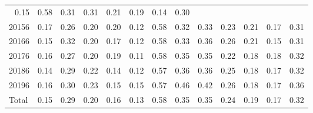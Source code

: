 \begin{table}[!h]
\begin{tabular}{lllllllllllll}
  \multicolumn{1}{r}{0.15} &
  \multicolumn{1}{r}{0.58} &
  \multicolumn{1}{r}{0.31} &
  \multicolumn{1}{r}{0.31} &
  \multicolumn{1}{r}{0.21} &
  \multicolumn{1}{r}{0.19} &
  \multicolumn{1}{r}{0.14} &
  \multicolumn{1}{r}{0.30} \\
\multicolumn{1}{l}{\hspace{1em}20156} &
  \multicolumn{1}{|r}{0.17} &
  \multicolumn{1}{r}{0.26} &
  \multicolumn{1}{r}{0.20} &
  \multicolumn{1}{r}{0.20} &
  \multicolumn{1}{r}{0.12} &
  \multicolumn{1}{r}{0.58} &
  \multicolumn{1}{r}{0.32} &
  \multicolumn{1}{r}{0.33} &
  \multicolumn{1}{r}{0.23} &
  \multicolumn{1}{r}{0.21} &
  \multicolumn{1}{r}{0.17} &
  \multicolumn{1}{r}{0.31} \\
\multicolumn{1}{l}{\hspace{1em}20166} &
  \multicolumn{1}{|r}{0.15} &
  \multicolumn{1}{r}{0.32} &
  \multicolumn{1}{r}{0.20} &
  \multicolumn{1}{r}{0.17} &
  \multicolumn{1}{r}{0.12} &
  \multicolumn{1}{r}{0.58} &
  \multicolumn{1}{r}{0.33} &
  \multicolumn{1}{r}{0.36} &
  \multicolumn{1}{r}{0.26} &
  \multicolumn{1}{r}{0.21} &
  \multicolumn{1}{r}{0.15} &
  \multicolumn{1}{r}{0.31} \\
\multicolumn{1}{l}{\hspace{1em}20176} &
  \multicolumn{1}{|r}{0.16} &
  \multicolumn{1}{r}{0.27} &
  \multicolumn{1}{r}{0.20} &
  \multicolumn{1}{r}{0.19} &
  \multicolumn{1}{r}{0.11} &
  \multicolumn{1}{r}{0.58} &
  \multicolumn{1}{r}{0.35} &
  \multicolumn{1}{r}{0.35} &
  \multicolumn{1}{r}{0.22} &
  \multicolumn{1}{r}{0.18} &
  \multicolumn{1}{r}{0.18} &
  \multicolumn{1}{r}{0.32} \\
\multicolumn{1}{l}{\hspace{1em}20186} &
  \multicolumn{1}{|r}{0.14} &
  \multicolumn{1}{r}{0.29} &
  \multicolumn{1}{r}{0.22} &
  \multicolumn{1}{r}{0.14} &
  \multicolumn{1}{r}{0.12} &
  \multicolumn{1}{r}{0.57} &
  \multicolumn{1}{r}{0.36} &
  \multicolumn{1}{r}{0.36} &
  \multicolumn{1}{r}{0.25} &
  \multicolumn{1}{r}{0.18} &
  \multicolumn{1}{r}{0.17} &
  \multicolumn{1}{r}{0.32} \\
\multicolumn{1}{l}{\hspace{1em}20196} &
  \multicolumn{1}{|r}{0.16} &
  \multicolumn{1}{r}{0.30} &
  \multicolumn{1}{r}{0.23} &
  \multicolumn{1}{r}{0.15} &
  \multicolumn{1}{r}{0.15} &
  \multicolumn{1}{r}{0.57} &
  \multicolumn{1}{r}{0.46} &
  \multicolumn{1}{r}{0.42} &
  \multicolumn{1}{r}{0.26} &
  \multicolumn{1}{r}{0.18} &
  \multicolumn{1}{r}{0.17} &
  \multicolumn{1}{r}{0.36} \\
\multicolumn{1}{l}{\hspace{1em}Total} &
  \multicolumn{1}{|r}{0.15} &
  \multicolumn{1}{r}{0.29} &
  \multicolumn{1}{r}{0.20} &
  \multicolumn{1}{r}{0.16} &
  \multicolumn{1}{r}{0.13} &
  \multicolumn{1}{r}{0.58} &
  \multicolumn{1}{r}{0.35} &
  \multicolumn{1}{r}{0.35} &
  \multicolumn{1}{r}{0.24} &
  \multicolumn{1}{r}{0.19} &
  \multicolumn{1}{r}{0.17} &
  \multicolumn{1}{r}{0.32} \\
\cline{1-13}
\end{tabular}
\end{table}
